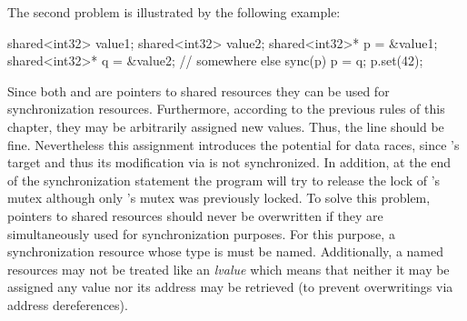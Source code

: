 The second problem is illustrated by the following example:
\begin{ccode}
shared<int32> value1;
shared<int32> value2;
shared<int32>* p = &value1;
shared<int32>* q = &value2;
// somewhere else
sync(p) {
  p = q;
  p.set(42);
}
\end{ccode}
Since both  and  are pointers to shared resources they can be used for synchronization resources. Furthermore, according to the previous rules of this chapter, they may be arbitrarily assigned new values. Thus, the line  should be fine. Nevertheless this assignment introduces the potential for data races, since 's target  and thus its modification via  is not synchronized. In addition, at the end of the synchronization statement the program will try to release the lock of 's mutex although only 's mutex was previously locked. To solve this problem, pointers to shared resources should never be overwritten if they are simultaneously used for synchronization purposes. For this purpose, a synchronization resource whose type is  must be named. Additionally, a named resources may not be treated like an \textit{lvalue} which means that neither it may be assigned any value nor its address may be retrieved (to prevent overwritings via address dereferences).